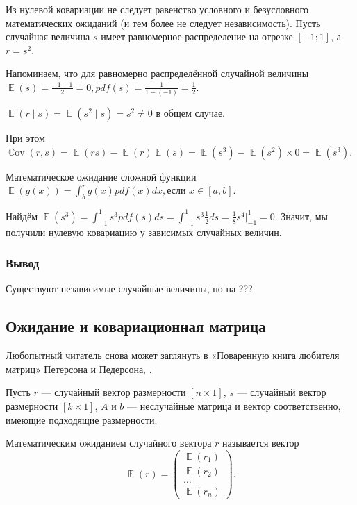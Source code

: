 \documentclass[12pt]{article}
\DeclareMathOperator{\Cov}{\mathbb{C}ov}
\DeclareMathOperator{\E}{\mathbb{E}}
\begin{document}
\begin{problem}
    Из нулевой ковариации не следует равенство условного и безусловного математических ожиданий (и тем более не следует независимость). Пусть случайная величина $s$ имеет равномерное распределение на отрезке $[-1; 1]$, а $r = s^2$.

    \begin{sol}

    Напоминаем, что для равномерно распределённой случайной величины \(\E(s) = \frac{-1+1}{2} = 0, pdf(s) = \frac{1}{1 - (-1)} = \frac{1}{2}.\)
    
    \(\E(r \mid s) = \E(s^2 \mid s) = s^2 \neq 0\) в общем случае.

    При этом \(\Cov(r, s) = \E(rs) - \E(r)\E(s) = \E(s^3) - \E(s^2) \times 0 = \E(s^3).\)

    Математическое ожидание сложной функции \( \E(g(x)) = \int^r_b g(x) pdf(x) dx, \text{если } x \in [a, b].\)
    
    Найдём \(\E(s^3) = \int^{1}_{-1} s^3 pdf(s) ds = \int^{1}_{-1} s^3 \frac{1}{2} ds = \frac{1}{8} s^4 | ^1_{-1} = 0.\) Значит, мы получили нулевую ковариацию у зависимых случайных величин.    
    \end{sol}
\end{problem}

\subsubsection*{Вывод}
Существуют независимые случайные величины, но на ???

\subsection{Ожидание и ковариационная матрица }

Любопытный читатель снова может заглянуть в  «Поваренную книга любителя матриц» Петерсона и Педерсона, \cite{petersen2012matrix}.

Пусть $r$ — случайный вектор размерности $[n \times 1]$, $s$ — случайный вектор размерности $[k \times 1]$, $A$ и $b$ — неслучайные матрица и вектор соответственно, имеющие подходящие размерности.

Математическим ожиданием случайного вектора $r$ называется вектор
\[
\E(r) = \begin{pmatrix}
	\E(r_1)  \\
	\E(r_2)  \\
        \dots \\
        \E(r_n)
      \end{pmatrix}.
\]
\end{document}
